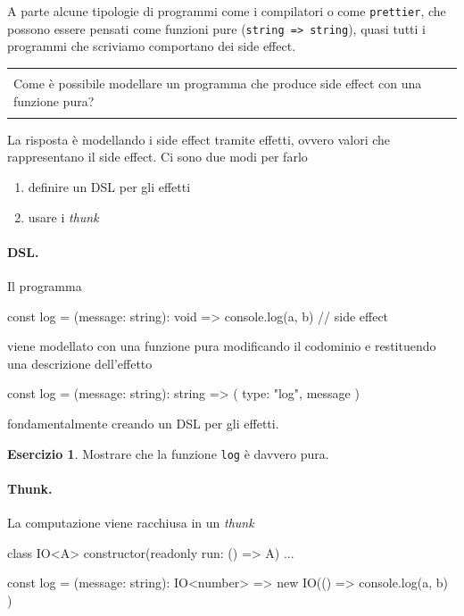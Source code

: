 \documentclass[12pt]{article}
\theoremstyle{definition}
\newtheorem{exercise}{Esercizio}[section]
\newenvironment{demo}
    {\begin{center}
    \begin{tabular}{|p{0.9\textwidth}|}
    \hline\\
    }
    {
    \\\\\hline
    \end{tabular}
    \end{center}
    }
\newenvironment{code}
  {\vspace{0.5cm} \VerbatimEnvironment\begin{typescriptcode}}
  {\end{typescriptcode} \vspace{0.2cm}}
\begin{document}
A parte alcune tipologie di programmi come i compilatori o come \texttt{prettier}, che possono essere pensati come funzioni pure (\texttt{string => string}),
quasi tutti i programmi che scriviamo comportano dei side effect.

\begin{demo}
Come è possibile modellare un programma che produce side effect con una funzione pura?
\end{demo}

La risposta è modellando i side effect tramite effetti, ovvero valori che rappresentano il side effect. Ci sono due modi per farlo

\begin{enumerate}
  \item definire un DSL per gli effetti
  \item usare i \emph{thunk}
\end{enumerate}

\paragraph{DSL.} Il programma

\begin{code}
const log = (message: string): void => {
  console.log(a, b) // side effect
}
\end{code}

viene modellato con una funzione pura modificando il codominio e restituendo una descrizione dell'effetto

\begin{code}
const log = (message: string): string => ({
  type: "log",
  message
})
\end{code}

fondamentalmente creando un DSL per gli effetti.

\begin{exercise}
Mostrare che la funzione \texttt{log} è davvero pura.
\end{exercise}

\paragraph{Thunk.} La computazione viene racchiusa in un \emph{thunk}

\begin{code}
class IO<A> {
  constructor(readonly run: () => A) {}
  ...
}

const log = (message: string): IO<number> =>
  new IO(() => {
    console.log(a, b)
  })
\end{code}
\end{document}
